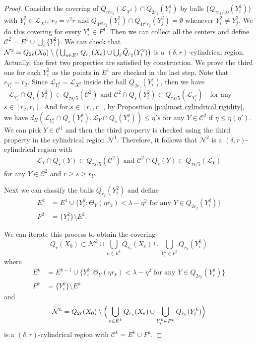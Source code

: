 \documentclass[11pt,reqno]{amsart}
\numberwithin{equation}{section}
\newcommand{\cC}{\mathcal{C}}
\newcommand{\cL}{\mathcal{L}}
\newcommand{\cN}{\mathcal{N}}
\theoremstyle{definition}
\theoremstyle{remark}
\theoremstyle{remark}
\theoremstyle{remark}
\theoremstyle{remark}\newtheorem{conjecture}[equation]{Conjecture}
\theoremstyle{remark}\newtheorem{question}[equation]{Question}
\begin{document}
\begin{proof}
    
    Consider the covering of $Q_{\eta' r_1}(\cL_{X^2}) \cap Q_{2r_1}(Y^1_i)$ by balls $\{Q_{\tau r_2/10}(Y^2_i)\}$ with $Y^2_i \in \cL_{X^2}$, $r_2 = \tau^2 r$ and $Q_{4\tau^2 r_2}(Y^2_i) \cap Q_{4\tau^2 r_2}(Y^2_j) =\emptyset$ whenever $Y_i^2 \neq Y^2_j$. We do this covering for every $Y^1_i \in F^1$. Then we can collect all the centers and define $\cC^2 = E^1 \cup \bigcup_i \{Y^2_i\}$. We can check that $\cN^2 = Q_{2r}(X_0) \setminus \big(\bigcup_{e \in E^1}Q_{r_e}(X_e) \cup \bigcup_i \Bar{Q}_{r_2}(Y^2_i) \big)$ is a $(\delta,r)$-cylindrical region. Actually, the first two properties are satisfied by construction. We prove the third one for each $Y^2_i$ as the points in $E^1$ are checked in the last step. Note that $r_{Y^2_i} = r_2$. Since $\cL_{Y^2_i} = \cL_{X^2}$ inside the ball $Q_{2r_1}(Y^1_i)$, then we have 
$\text{ $\cL_{Y^2_i}\cap Q_s(Y^2_i) \subset Q_{\tau s/5}(\cC^2)$ and $\cC^2 \cap Q_s(Y^2_i) \subset Q_{\tau s/5}(\cL_{Y^2_i})$ }$
    for any $s\in [r_2,r_1]$. And for $s\in[r_1,r]$, by Proposition \ref{p:almost cylindrical rigidity}, we have $d_H(\cL_{Y_i^2}\cap Q_{s}(Y^2_i), \cL_{Y}\cap Q_s(Y^2_i)) \le \eta' s$ for any $Y \in \cC^2$ if $\eta\le \eta(\eta')$. We can pick $Y \in \cC^1$ and then the third property is checked using the third property in the cylindrical region $\cN^1$. Therefore, it follows that $\cN^2$ is a $(\delta, r)$-cylindrical region with 
\begin{align}\label{e:bettercovering5.8}
    \text{ $\cL_{Y}\cap Q_s(Y) \subset Q_{\tau s/5}(\cC^2)$ and $\cC^2 \cap Q_s(Y) \subset Q_{\tau s/5}(\cL_{Y})$ }
    \end{align}
    for any $Y\in \cC^2$ and $r\ge s\ge r_Y$. 

    Next we can classify the balls $Q_{r_2}(Y^2_i)$ and define
    \begin{equation*}
    \begin{split}
        E^2 &= E^1 \cup \{Y^2_i : \Theta_Y(\eta r_2) < \lambda - \eta^2 \text{ for any } Y \in Q_{2r_2}(Y^2_i) \} \\
        F^2 &= \{Y^2_i\} \setminus E^2.
    \end{split}
    \end{equation*}
    
We can iterate this process to obtain the covering
\begin{equation*}
    Q_r(X_0) \subset \cN^k \cup \bigcup_{e \in E^k} Q_{r_e}(X_e) \cup \bigcup_{Y^k_i \in F^k} Q_{r_k}(Y^k_i)
\end{equation*}
where 
\begin{equation*}
\begin{split}
    E^k &= E^{k-1} \cup \{Y^k_i: \Theta_Y(\eta r_k) < \lambda -\eta^2 \text{ for any } Y\in Q_{2r_k}(Y^k_i) \} \\
    F^k &= \{Y^k_i\} \setminus E^k
\end{split}
\end{equation*}
and $$\cN^k = Q_{2r}(X_0) \setminus \Big( \bigcup_{e\in E^k} \Bar{Q}_{r_e}(X_e) \cup \bigcup_{Y^k_i \in F^k} \Bar{Q}_{r_k}(Y^k_i) \Big)$$
is a $(\delta,r)$-cylindrical region with $\cC^k = E^k \cup F^k$. 


\end{proof}
\end{document}
